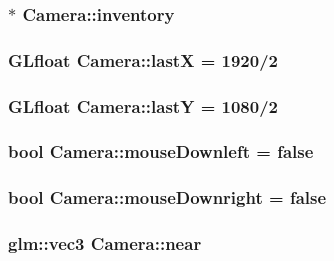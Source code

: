 \subsubsection[{inventory}]{$\ast$ Camera\+::inventory}\label{class_camera_ae10beb7db168af6a6f35d4be223cccf3}
\hypertarget{class_camera_ab551353ae0163e4483f36470d42226f2}{}
\subsubsection[{last\+X}]{\setlength{\rightskip}{0pt plus 5cm}G\+Lfloat Camera\+::last\+X = 1920/2}\label{class_camera_ab551353ae0163e4483f36470d42226f2}
\hypertarget{class_camera_a3aeb91bbf0256cac3b523353795ed398}{}
\subsubsection[{last\+Y}]{\setlength{\rightskip}{0pt plus 5cm}G\+Lfloat Camera\+::last\+Y = 1080/2}\label{class_camera_a3aeb91bbf0256cac3b523353795ed398}
\hypertarget{class_camera_aba5bea2c77f7e3157307d9e272ada8ab}{}
\subsubsection[{mouse\+Downleft}]{\setlength{\rightskip}{0pt plus 5cm}bool Camera\+::mouse\+Downleft = false}\label{class_camera_aba5bea2c77f7e3157307d9e272ada8ab}
\hypertarget{class_camera_a3a2c6b49cdf87ea655f8d6dd97194855}{}
\subsubsection[{mouse\+Downright}]{\setlength{\rightskip}{0pt plus 5cm}bool Camera\+::mouse\+Downright = false}\label{class_camera_a3a2c6b49cdf87ea655f8d6dd97194855}
\hypertarget{class_camera_a10619630853c71114ba755595067955c}{}
\subsubsection[{near}]{\setlength{\rightskip}{0pt plus 5cm}glm\+::vec3 Camera\+::near}\label{class_camera_a10619630853c71114ba755595067955c}
\hypertarget{class_camera_a005a78960a2726c637951b75a00925c8}{}
